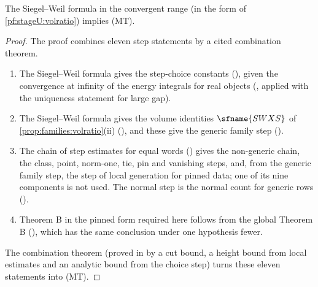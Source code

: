 \begin{proposition}\label{pf:stageU:mainrow}
The Siegel--Weil formula in the convergent range (in the form of \cref{pf:stageU:volratio}) implies \textup{(MT)}.
\end{proposition}

\begin{proof}
The proof combines eleven step statements by a cited combination theorem.
\begin{enumerate}[label=\arabic*.]
\item The Siegel--Weil formula gives the step-choice constants
(), given the convergence at infinity of the energy
integrals for real objects (, applied with the
uniqueness statement  for large gap).
\item The Siegel--Weil formula gives the volume identities $\sfname{SWXS}$ of \cref{prop:families:volratio}(ii)
(), and these give the generic family step
().
\item The chain of step estimates for equal words () gives
the non-generic chain, the class, point, norm-one, tie, pin and vanishing steps, and, from the generic family step, the
step of local generation for pinned data; one of its nine components is not used. The normal step is the normal count
for generic rows ().
\item Theorem B in the pinned form required here follows from the global Theorem B
(), which has the same conclusion under one hypothesis
fewer.
\end{enumerate}
The combination theorem  (proved in
 by a cut bound, a height bound from local estimates and an analytic
bound from the choice step) turns these eleven statements into (MT).
\end{proof}

